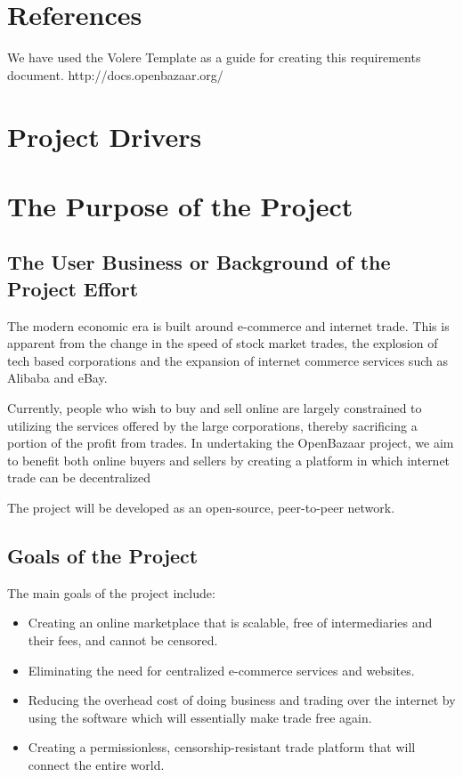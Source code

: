 \documentclass{article}
\begin{document}
\section*{References}
We have used the Volere Template as a guide for creating this requirements document.
http://docs.openbazaar.org/

\section*{Project Drivers}

\section{The Purpose of the Project}

\subsection{The User Business or Background of the Project Effort}

The modern economic era is built around e-commerce and internet trade. This is apparent from the change in the speed of stock market trades, the explosion of tech based corporations and the expansion of internet commerce services such as Alibaba and eBay.

Currently, people who wish to buy and sell online are largely constrained to utilizing the services offered by the large corporations, thereby sacrificing a portion of the profit from trades. In undertaking the OpenBazaar project, we aim to benefit both online buyers and sellers by creating a platform in which internet trade can be decentralized


The project will be developed as an open-source, peer-to-peer network. 


\subsection{Goals of the Project}
The main goals of the project include:

\begin{itemize}

\item
Creating an online marketplace that is scalable, free of intermediaries and their fees, and cannot be censored.

\item
Eliminating the need for centralized e-commerce services and websites.

\item
Reducing the overhead cost of doing business and trading over the internet by using the software which will essentially make trade free again.

\item
Creating a permissionless, censorship-resistant trade platform that will connect the entire world.
\end{itemize}
\end{document}
